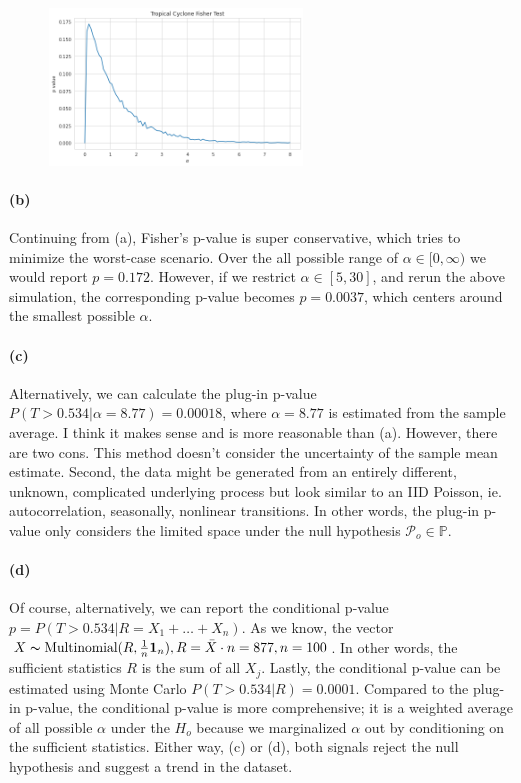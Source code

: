 \documentclass[11pt, letterpaper]{article}
\begin{document}
\begin{figure}[!h]
  \centering
  \includegraphics[width=0.6\textwidth]{hw6-1.png}
  \captionsetup{justification=centering}
\end{figure}

\paragraph{(b)}
Continuing from (a), Fisher's p-value is super conservative, which tries to minimize the worst-case scenario. Over the all possible range of $\alpha \in [0, \infty)$ we would report $p = 0.172$. However, if we restrict $\alpha \in [5, 30]$, and rerun the above simulation, the corresponding p-value becomes $p = 0.0037$, which centers around the smallest possible $\alpha$.

\paragraph{(c)}
Alternatively, we can calculate the plug-in p-value $P(T>0.534|\alpha=8.77) = 0.00018$, where $\alpha=8.77$ is estimated from the sample average. I think it makes sense and is more reasonable than (a). However, there are two cons. This method doesn't consider the uncertainty of the sample mean estimate. Second, the data might be generated from an entirely different, unknown, complicated underlying process but look similar to an IID Poisson, ie. autocorrelation, seasonally, nonlinear transitions. In other words, the plug-in p-value only considers the limited space under the null hypothesis $\mathcal{P}_o \in \mathbb{P}$.

\paragraph{(d)}
Of course, alternatively, we can report the conditional p-value $p = P(T>0.534|R=X_1+ \dots +X_n)$. As we know, the vector $X \thicksim \text{Multinomial}(R, \frac{1}{n}\mathbf{1}_n), R=\bar{X}\cdot n=877, n = 100$. In other words, the sufficient statistics $R$ is the sum of all $X_j$. Lastly, the conditional p-value can be estimated using Monte Carlo $P(T>0.534|R) = 0.0001$. Compared to the plug-in p-value, the conditional p-value is more comprehensive; it is a weighted average of all possible $\alpha$ under the $H_o$ because we marginalized $\alpha$ out by conditioning on the sufficient statistics. Either way, (c) or (d), both signals reject the null hypothesis and suggest a trend in the dataset.
\end{document}
